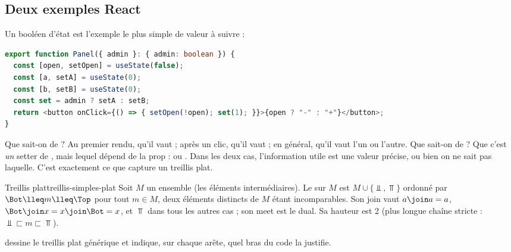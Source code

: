 \subsection{Deux exemples React}

Un booléen d'état est l'exemple le plus simple de valeur à suivre :

\begin{lstlisting}[language=TypeScript,caption={Un booléen d'état et un setter choisi dynamiquement (exemple d'illustration)},label={lst:treillis-simples-bool}]
export function Panel({ admin }: { admin: boolean }) {
  const [open, setOpen] = useState(false);
  const [a, setA] = useState(0);
  const [b, setB] = useState(0);
  const set = admin ? setA : setB;
  return <button onClick={() => { setOpen(!open); set(1); }}>{open ? "-" : "+"}</button>;
}
\end{lstlisting}

Que sait-on de  ? Au premier rendu, qu'il vaut  ;
après un clic, qu'il vaut  ; en général, qu'il vaut l'un ou
l'autre. Que sait-on de  ? Que c'est \emph{un} setter de
, mais lequel dépend de la prop :  ou .
Dans les deux cas, l'information utile est \og une valeur précise, ou bien on
ne sait pas laquelle\fg{}. C'est exactement ce que capture un treillis plat.

\begin{definition}{Treillis plat}{treillis-simples-plat}
  Soit $M$ un ensemble (les éléments \og intermédiaires\fg{}). Le
   sur $M$ est $M \cup \{\Bot, \Top\}$ ordonné par
  $\Bot \lleq m \lleq \Top$ pour tout $m \in M$, deux éléments distincts de
  $M$ étant incomparables. Son join vaut $a \join a = a$,
  $\Bot \join x = x \join \Bot = x$, et $\Top$ dans tous les autres cas ; son
  meet est le dual. Sa hauteur est 2 (plus longue chaîne stricte :
  $\Bot \sqsubset m \sqsubset \Top$).
\end{definition}

 dessine le treillis plat générique et
indique, sur chaque arête, quel bras du code la justifie.

